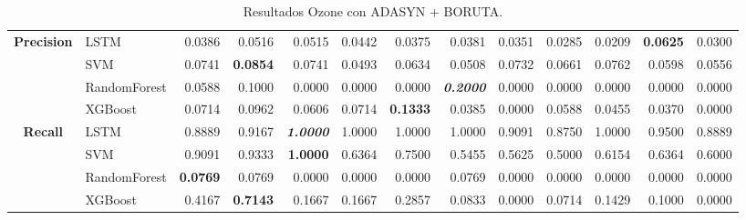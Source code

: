 \begin{table}[H]
\begin{adjustbox}{max width=12cm}
\begin{tabular}{|c|l|r|r|r|r|r|r|r|r|r|r|r|}
			\hline
			\textbf{Precision} &  LSTM &  0.0386 &  0.0516 &  0.0515 &  0.0442 &  0.0375 &  0.0381 &  0.0351 &  0.0285 &  0.0209 & \textbf{  0.0625 } &  0.0300 \\
			&  SVM &  0.0741 & \textbf{  0.0854 } &  0.0741 &  0.0493 &  0.0634 &  0.0508 &  0.0732 &  0.0661 &  0.0762 &  0.0598 &  0.0556 \\
			&  RandomForest &  0.0588 &  0.1000 &  0.0000 &  0.0000 &  0.0000 & \textit{ \textbf{  0.2000 } } &  0.0000 &  0.0000 &  0.0000 &  0.0000 &  0.0000 \\
			&  XGBoost &  0.0714 &  0.0962 &  0.0606 &  0.0714 & \textbf{  0.1333 } &  0.0385 &  0.0000 &  0.0588 &  0.0455 &  0.0370 &  0.0000 \\
			\hline
			\textbf{Recall} &  LSTM &  0.8889 &  0.9167 & \textit{ \textbf{  1.0000 } } &  1.0000 &  1.0000 &  1.0000 &  0.9091 &  0.8750 &  1.0000 &  0.9500 &  0.8889 \\
			&  SVM &  0.9091 &  0.9333 & \textbf{  1.0000 } &  0.6364 &  0.7500 &  0.5455 &  0.5625 &  0.5000 &  0.6154 &  0.6364 &  0.6000 \\
			&  RandomForest & \textbf{  0.0769 } &  0.0769 &  0.0000 &  0.0000 &  0.0000 &  0.0769 &  0.0000 &  0.0000 &  0.0000 &  0.0000 &  0.0000 \\
			&  XGBoost &  0.4167 & \textbf{  0.7143 } &  0.1667 &  0.1667 &  0.2857 &  0.0833 &  0.0000 &  0.0714 &  0.1429 &  0.1000 &  0.0000 \\
			\hline
		\end{tabular}
	\end{adjustbox}
	\caption{Resultados Ozone con ADASYN + BORUTA.}
	\label{tab:Ozone_ADASYN_BORUTA}
\end{table}

